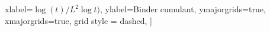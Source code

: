 		xlabel=$\log(t)/L^2\log t)$,
		ylabel={Binder cumulant},
		ymajorgrids=true,
		xmajorgrids=true,
		grid style = dashed,
		]
